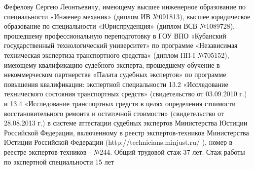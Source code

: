 Фефелову Сергею Леонтьевичу, имеющему высшее инженерное образование по специальности «Инженер механик» (диплом ИВ №091813), высшее юридическое образование по специальности «Юриспруденция» (диплом ВСВ №1089728), прошедшему профессиональную переподготовку в ГОУ ВПО «Кубанский государственный технологический университет» по программе «Независимая техническая экспертиза транспортного средства» (диплом ПП-I №705152), имеющему квалификацию судебного эксперта, прошедшему обучение в некоммерческом партнерстве «Палата судебных экспертов» по программе повышения квалификации: экспертной специальности 13.2 «Исследование технического состояния транспортных средств» (свидетельство от 03.09.2010 г.) и 13.4 «Исследование транспортных средств в целях определения стоимости восстановительного ремонта и остаточной стоимости» (свидетельство от 28.08.2013 г.) в системе аттестации судебных экспертов Министерства Юстиции Российской Федерации, включенному в реестр экспертов-техников Министерства Юстиции Российской Федерации (http://technicians.minjust.ru/ ), номер в реестре экспертов-техников - №244. Общий трудовой стаж 37 лет. Стаж работы по экспертной специальности 15 лет